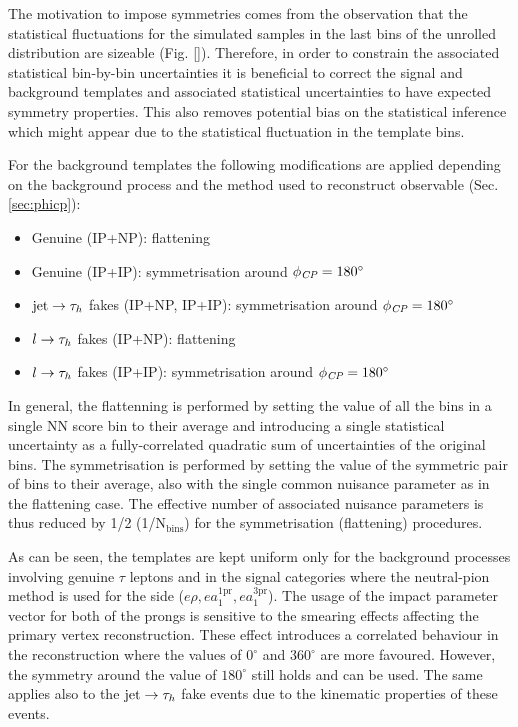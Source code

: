 The motivation to impose symmetries comes from the observation that the statistical fluctuations for the simulated samples in the last bins of the unrolled \phicp distribution are sizeable (Fig. \ref{}). Therefore, in order to constrain the associated statistical bin-by-bin uncertainties it is beneficial to correct the signal and background templates and associated statistical uncertainties to have expected symmetry properties. This also removes potential bias on the statistical inference which might appear due to the statistical fluctuation in the template bins.

For the background templates the following modifications are applied depending on the background process and the method used to reconstruct \phicp observable (Sec. \ref{sec:phicp}):
\begin{itemize}
    \item Genuine \tauh (IP+NP): flattening
    \item Genuine \tauh (IP+IP): symmetrisation around $\phi_{\textit{CP}}=180^\circ$
    \item $\text{jet} \to \tau_h$ fakes (IP+NP, IP+IP): symmetrisation around $\phi_{\textit{CP}}=180^\circ$
    \item $l \to \tau_h$ fakes (IP+NP): flattening
    \item $l \to \tau_h$ fakes (IP+IP): symmetrisation around $\phi_{\textit{CP}}=180^\circ$
\end{itemize}

In general, the flattenning is performed by setting the value of all the \phicp bins in a single NN score bin to their average and introducing a single statistical uncertainty as a fully-correlated quadratic sum of uncertainties of the original bins. The symmetrisation is performed by setting the value of the symmetric pair of bins to their average, also with the single common nuisance parameter as in the flattening case. The effective number of associated nuisance parameters is thus reduced by 1/2 (1/$\text{N}_\text{bins}$) for the symmetrisation (flattening) procedures.

As can be seen, the templates are kept uniform only for the background processes involving genuine $\tau$ leptons and in the signal categories where the neutral-pion method is used for the \tauh side ($e\rho, e a_1^\text{1pr}, e a_1^\text{3pr}$). The usage of the impact parameter vector for both of the prongs is sensitive to the smearing effects affecting the primary vertex reconstruction. These effect introduces a correlated behaviour in the \phicp reconstruction where the \phicp values of $0^\circ$ and $360^\circ$ are more favoured. However, the symmetry around the \phicp value of $180^\circ$ still holds and can be used. The same applies also to the $\text{jet} \to \tau_h$ fake events due to the kinematic properties of these events.

